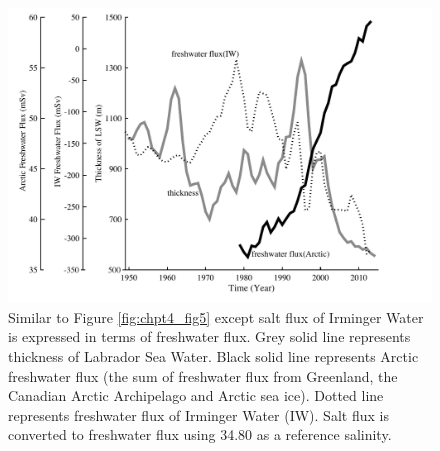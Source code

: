 \begin{figure}
	\centering
	\includegraphics{figs_app/FigS7.pdf}
	\caption[Similar to Figure \ref{fig:chpt4_fig5} except salt flux of Irminger Water is expressed in terms of freshwater flux.]{Similar to Figure \ref{fig:chpt4_fig5} except salt flux of Irminger Water is expressed in terms of freshwater flux.  Grey solid line represents thickness of Labrador Sea Water.  Black solid line represents Arctic freshwater flux (the sum of freshwater flux from Greenland, the Canadian Arctic Archipelago and Arctic sea ice).  Dotted line represents freshwater flux of Irminger Water (IW). Salt flux is converted to freshwater flux using 34.80 as a reference salinity.}
	\label{fig:SI4_fig7}
\end{figure}

